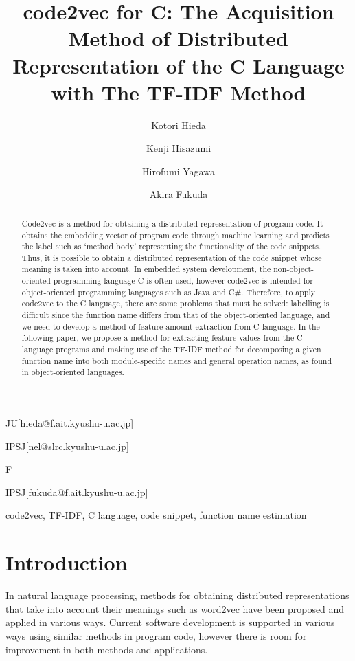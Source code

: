 \documentclass[JIP]{apris}
\begin{document}
\title{code2vec for C: The Acquisition Method of Distributed Representation of the C Language with The TF-IDF Method}


\author{Kotori Hieda}{JU}[hieda@f.ait.kyushu-u.ac.jp]
\author{Kenji Hisazumi}{IPSJ}[nel@slrc.kyushu-u.ac.jp]
\author{Hirofumi Yagawa}{F}
\author{Akira Fukuda}{IPSJ}[fukuda@f.ait.kyushu-u.ac.jp]


\begin{abstract}
Code2vec is a method for obtaining a distributed representation of program code. It obtains the embedding vector of program code through machine learning and predicts the label such as ‘method body’ representing the functionality of the code snippets. Thus, it is possible to obtain a distributed representation of the code snippet whose meaning is taken into account. In embedded system development, the non-object-oriented programming language C is often used, however code2vec is intended for object-oriented programming languages such as Java and C\#. Therefore, to apply code2vec to the C language, there are some problems that must be solved: labelling is difficult since the function name differs from that of the object-oriented language, and we need to develop a method of feature amount extraction from C language. In the following paper, we propose a method for extracting feature values from the C language programs and making use of the TF-IDF method for decomposing a given function name into both module-specific names and general operation names, as found in object-oriented languages.
\end{abstract}

\begin{keyword}
code2vec, TF-IDF, C language, code snippet, function name estimation
\end{keyword}

\maketitle

\section{Introduction}
In natural language processing, methods for obtaining distributed representations that take into account their meanings such as word2vec\cite{rong2014word2vec} have been proposed and applied in various ways. Current software development is supported in various ways using similar methods in program code, however there is room for improvement in both methods and applications. 
\end{document}
